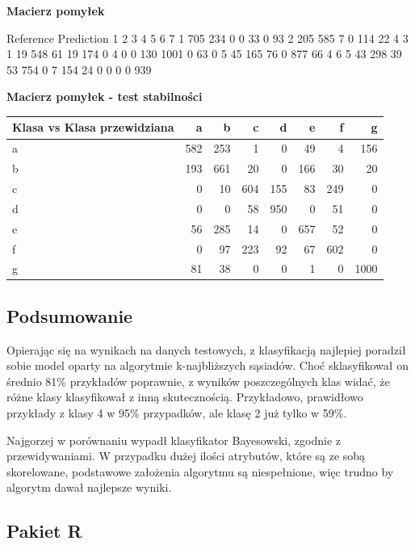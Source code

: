 \documentclass[11pt]{article} %
\begin{document}
\textbf{Macierz pomyłek}

          Reference
Prediction    1    2    3    4    5    6    7
         1  705  234    0    0   33    0   93
         2  205  585    7    0  114   22    4
         3    1   19  548   61   19  174    0
         4    0    0  130 1001    0   63    0
         5   45  165   76    0  877   66    4
         6    5   43  298   39   53  754    0
         7  154   24    0    0    0    0  939

\textbf{Macierz pomyłek - test stabilności}

\begin{center}
    \begin{tabular}{ | l | r | r | r | r | r | r | r | }
    \hline
 Klasa vs Klasa przewidziana &  a &  b &  c &  d &  e &  f &  g \\ \hline
a &  582 & 253 &  1 &  0 & 49 &  4 & 156 \\
b &  193 & 661 & 20 &  0 & 166 & 30 & 20 \\
c &   0 & 10 & 604 & 155 & 83 & 249 &  0 \\
d &  0  & 0 & 58 & 950 &  0 & 51 &  0\\
e & 56 & 285 & 14 &  0 & 657 &  52 &  0 \\
f &  0  & 97 &  223 & 92  & 67 & 602 &  0 \\
g & 81 & 38 &  0  & 0  & 1  & 0 & 1000 \\ \hline
    \end{tabular}
\end{center}

\subsection{Podsumowanie}

Opierając się na wynikach na danych testowych, z klasyfikacją najlepiej poradził sobie model oparty na algorytmie k-najbliższych sąsiadów. 
Choć sklasyfikował on średnio 81\% przykładów poprawnie, z wyników poszczególnych klas widać, że różne klasy klasyfikował z inną skutecznością. Przykładowo, prawidłowo przykłady z klasy 4 w 95\% przypadków, ale  klasę 2 już tylko w 59\%.

Najgorzej w porównaniu wypadł klasyfikator Bayesowski, zgodnie z przewidywaniami. W przypadku dużej ilości atrybutów, które są ze sobą skorelowane, podstawowe założenia algorytmu są niespełnione, więc trudno by algorytm dawał najlepsze wyniki.

\subsection{Pakiet R}
\end{document}
